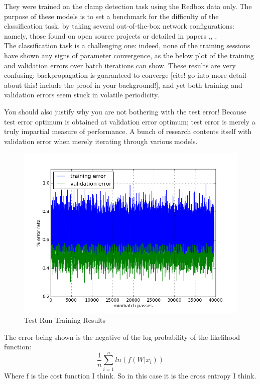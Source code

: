 \documentclass[a4paper,11pt]{article}
\begin{document}
They were trained on the clamp detection task using the Redbox data only. The purpose of these models is to set a benchmark for the difficulty of the classification task, by taking several out-of-the-box network configurations: namely, those found on open source projects or detailed in papers \cite{krizhevsky},\cite{transfer-learning}, \cite{decaf}. \\

The classification task is a challenging one: indeed, none of the training sessions have shown any signs of parameter convergence, as the below plot of the training and validation errors over batch iterations can show. These results are very confusing: backpropagation is guaranteed to converge [cite! go into more detail about this! include the proof in your background!], and yet both training and validation errors seem stuck in volatile periodicity.

You should also justify why you are not bothering with the test error! Because test error optimum is obtained at validation error optimum; test error is merely a truly impartial measure of performance. A bunch of research contents itself with validation error when merely iterating through various models. 

\begin{figure}[h!]
	\centering
	\includegraphics[scale=0.5]{images/test_run.png}
	\caption{Test Run Training Results}
\end{figure}

The error being shown is the negative of the log probability of the likelihood function:
\begin{equation}
\frac{1}{n}\sum\limits_{i=1}^n ln(f(W|x_i))
\end{equation}
Where f is the cost function I think. So in this case it is the cross entropy I think. \\
\end{document}
